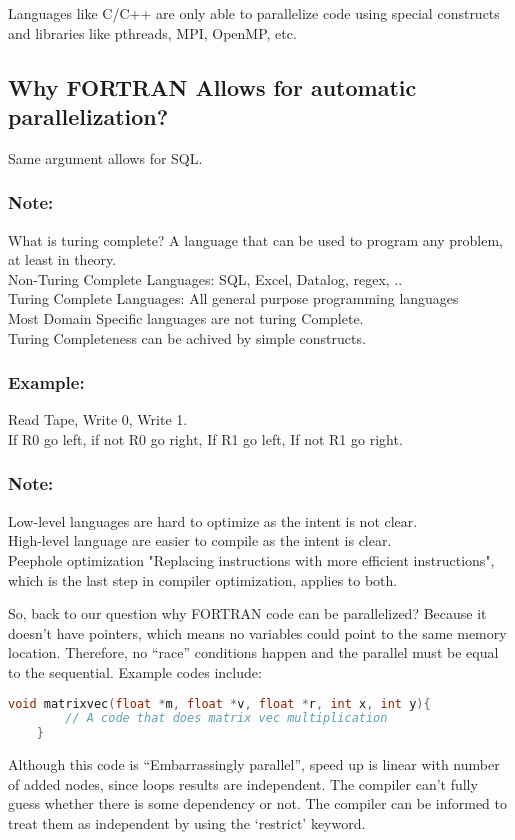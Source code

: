 \documentclass[twoside]{article}
\begin{document}
Languages like C/C++ are only able to parallelize code using special constructs and libraries like pthreads, MPI, OpenMP, etc.

\subsection{Why FORTRAN Allows for automatic parallelization?}
Same argument allows for SQL.

\subsubsection*{Note:}
What is turing complete? A language that can be used to program any problem, at least in theory.\\
Non-Turing Complete Languages: SQL, Excel, Datalog, regex, ..\\
Turing Complete Languages: All general purpose programming languages \\
Most Domain Specific languages are not turing Complete. \\
Turing Completeness can be achived by simple constructs.\\

\subsubsection*{Example:}
Read Tape, Write 0, Write 1. \\
If R0 go left, if not R0 go right, If R1 go left, If not R1 go right.


\subsubsection*{Note:}
Low-level languages are hard to optimize as the intent is not clear.\\
High-level language are easier to compile as the intent is clear.\\
Peephole optimization "Replacing instructions with more efficient instructions",
which is the last step in compiler optimization, applies to both.

    
So, back to our question why FORTRAN code can be parallelized? Because it doesn't have pointers, which means no variables could point to the same memory location.  Therefore, no ``race'' conditions happen and the parallel must be equal to the sequential.
Example codes include:
\begin{lstlisting}[language=c++]
    void matrixvec(float *m, float *v, float *r, int x, int y){
        // A code that does matrix vec multiplication
    }
\end{lstlisting}
Although this code is ``Embarrassingly parallel'', speed up is linear with number of added nodes, since loops results are independent. The compiler can't fully guess whether there is some dependency or not. The compiler can be informed to treat them as independent by using the `restrict' keyword. 
\end{document}
